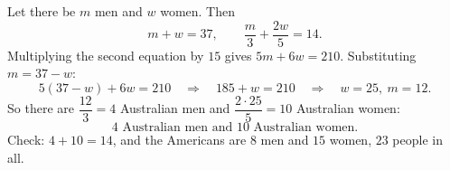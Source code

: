 Let there be $m$ men and $w$ women. Then
\[
m+w=37,\qquad \dfrac{m}{3}+\dfrac{2w}{5}=14 .
\]
Multiplying the second equation by $15$ gives $5m+6w=210$. Substituting $m=37-w$:
\[
5(37-w)+6w=210\quad\Longrightarrow\quad 185+w=210\quad\Longrightarrow\quad w=25,\ m=12 .
\]
So there are $\dfrac{12}{3}=4$ Australian men and $\dfrac{2\cdot25}{5}=10$ Australian women:
\[
\boxed{4\text{ Australian men and }10\text{ Australian women}}.
\]
Check: $4+10=14$, and the Americans are $8$ men and $15$ women, $23$ people in all.

